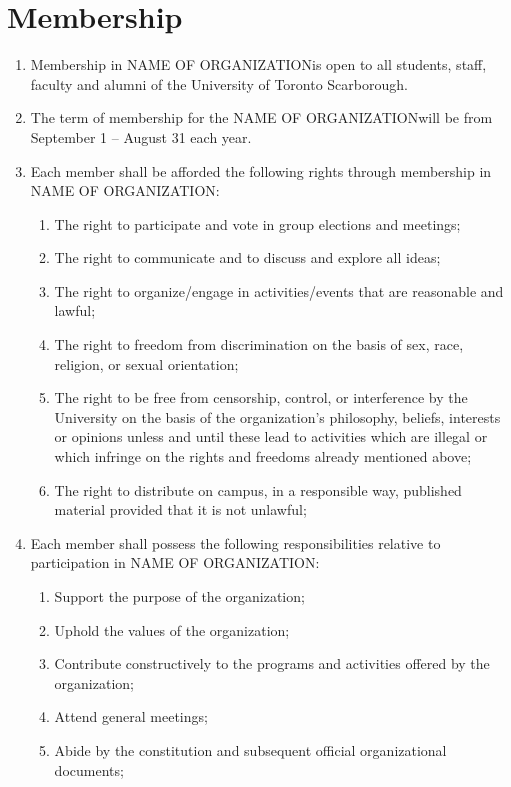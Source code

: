 \documentclass[12pt]{article}
\newcommand{\orgname}{NAME OF ORGANIZATION\space}
\begin{document}
\section{Membership}
\begin{enumerate}[{3}.1]
    \item Membership in \orgname is open to all students, staff, faculty and alumni of the University of Toronto Scarborough.
    \item The term of membership for the \orgname will be from September 1 – August 31 each year.
    \item Each member shall be afforded the following rights through membership in \orgname: 
    \begin{enumerate}[{3.3}.1]
        \item	The right to participate and vote in group elections and meetings;
        \item	The right to communicate and to discuss and explore all ideas;
        \item	The right to organize/engage in activities/events that are reasonable and lawful;
        \item	The right to freedom from discrimination on the basis of sex, race, religion, or sexual orientation;
        \item	The right to be free from censorship, control, or interference by the University on the basis of the organization’s philosophy, beliefs, interests or opinions unless and until these lead to activities which are illegal or which infringe on the rights and freedoms already mentioned above;
        \item	The right to distribute on campus, in a responsible way, published material provided that it is not unlawful;
    \end{enumerate}
    \item Each member shall possess the following responsibilities relative to participation in \orgname: 
    \begin{enumerate}[{3.4}.1]
        \item	Support the purpose of the organization; 
        \item	Uphold the values of the organization;
        \item	Contribute constructively to the programs and activities offered by the organization; 
        \item	Attend general meetings; 
        \item	Abide by the constitution and subsequent official organizational documents;

\end{enumerate}
\end{enumerate}
\end{document}
